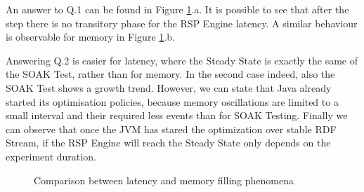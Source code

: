 An answer to Q.1 can be found in Figure \ref{fig:level3-step}.a. It is possible to see that after the step there is no transitory phase for the RSP Engine latency. A similar behaviour is observable for memory in Figure \ref{fig:level3-step}.b. 

Answering Q.2 is easier for latency, where the Steady State is exactly the same of the SOAK Test, rather than for memory. In the second case indeed, also the SOAK Test shows a growth trend. However, we can state that Java already started its optimisation policies, because memory oscillations are limited to a small interval and their required less events than for SOAK Testing. Finally we can observe that once the JVM has stared the optimization over stable RDF Stream, if the RSP Engine will reach the Steady State only depends on the experiment duration.

\begin{figure}[tbh]
  \centering
	\caption[\textsc{Analyser} Investigation Stack - Level 3 - Inter Experiment Comparison - Step Response Test]{Comparison between latency and memory filling phenomena} 
  	\label{fig:level3-step}
\end{figure}

%





